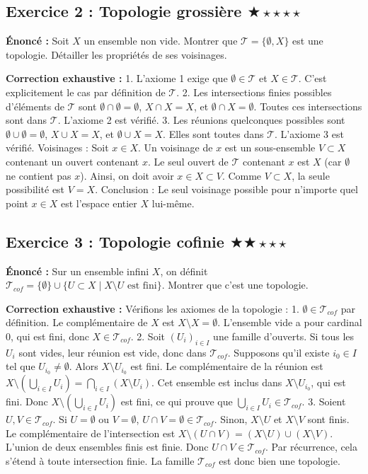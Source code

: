 \documentclass[11pt,a4paper]{article}
\begin{document}
\subsection*{Exercice 2 : Topologie grossière \quad $\bigstar\star\star\star\star$}
\textbf{Énoncé :}
Soit $X$ un ensemble non vide. Montrer que $\mathcal{T} = \{\emptyset, X\}$ est une topologie. Détailler les propriétés de ses voisinages.

\textbf{Correction exhaustive :}
1. L'axiome 1 exige que $\emptyset \in \mathcal{T}$ et $X \in \mathcal{T}$. C'est explicitement le cas par définition de $\mathcal{T}$.
2. Les intersections finies possibles d'éléments de $\mathcal{T}$ sont $\emptyset \cap \emptyset = \emptyset$, $X \cap X = X$, et $\emptyset \cap X = \emptyset$. Toutes ces intersections sont dans $\mathcal{T}$. L'axiome 2 est vérifié.
3. Les réunions quelconques possibles sont $\emptyset \cup \emptyset = \emptyset$, $X \cup X = X$, et $\emptyset \cup X = X$. Elles sont toutes dans $\mathcal{T}$. L'axiome 3 est vérifié.
Voisinages : Soit $x \in X$. Un voisinage de $x$ est un sous-ensemble $V \subset X$ contenant un ouvert contenant $x$. Le seul ouvert de $\mathcal{T}$ contenant $x$ est $X$ (car $\emptyset$ ne contient pas $x$). Ainsi, on doit avoir $x \in X \subset V$. Comme $V \subset X$, la seule possibilité est $V = X$.
Conclusion : Le seul voisinage possible pour n'importe quel point $x \in X$ est l'espace entier $X$ lui-même.
\subsection*{Exercice 3 : Topologie cofinie \quad $\bigstar\bigstar\star\star\star$}
\textbf{Énoncé :}
Sur un ensemble infini $X$, on définit $\mathcal{T}_{cof} = \{\emptyset\} \cup \{U \subset X \mid X \setminus U \text{ est fini}\}$. Montrer que c'est une topologie.

\textbf{Correction exhaustive :}
Vérifions les axiomes de la topologie :
1. $\emptyset \in \mathcal{T}_{cof}$ par définition. Le complémentaire de $X$ est $X \setminus X = \emptyset$. L'ensemble vide a pour cardinal $0$, qui est fini, donc $X \in \mathcal{T}_{cof}$.
2. Soit $(U_i)_{i \in I}$ une famille d'ouverts. Si tous les $U_i$ sont vides, leur réunion est vide, donc dans $\mathcal{T}_{cof}$. Supposons qu'il existe $i_0 \in I$ tel que $U_{i_0} \neq \emptyset$. Alors $X \setminus U_{i_0}$ est fini. Le complémentaire de la réunion est $X \setminus \left(\bigcup_{i \in I} U_i\right) = \bigcap_{i \in I} (X \setminus U_i)$. Cet ensemble est inclus dans $X \setminus U_{i_0}$, qui est fini. Donc $X \setminus \left(\bigcup_{i \in I} U_i\right)$ est fini, ce qui prouve que $\bigcup_{i \in I} U_i \in \mathcal{T}_{cof}$.
3. Soient $U, V \in \mathcal{T}_{cof}$. Si $U = \emptyset$ ou $V = \emptyset$, $U \cap V = \emptyset \in \mathcal{T}_{cof}$. Sinon, $X \setminus U$ et $X \setminus V$ sont finis. Le complémentaire de l'intersection est $X \setminus (U \cap V) = (X \setminus U) \cup (X \setminus V)$. L'union de deux ensembles finis est finie. Donc $U \cap V \in \mathcal{T}_{cof}$. Par récurrence, cela s'étend à toute intersection finie.
La famille $\mathcal{T}_{cof}$ est donc bien une topologie.
\end{document}
